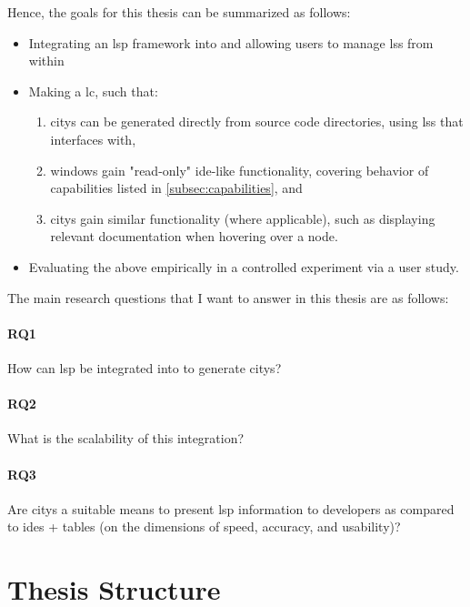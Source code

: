 \documentclass[../thesis]{subfiles}
\begin{document}
Hence, the goals for this thesis can be summarized as follows:
\begin{itemize}
	\item Integrating an \gls{lsp} framework into \SEE{} and allowing users to manage \glspl{ls} from within \SEE{}
	\item Making \SEE{} a \gls{lc}, such that:
	      \begin{enumerate}
		      \item \Glspl{city} can be generated directly from source code directories, using \glspl{ls} that \SEE{} interfaces with,
		      \item \Glspl{window} gain "read-only" \gls{ide}-like functionality, covering behavior of capabilities listed in \cref{subsec:capabilities}, and
		      \item \Glspl{city} gain similar functionality (where applicable), such as displaying relevant documentation when hovering over a node.
	      \end{enumerate}
	\item Evaluating the above empirically in a controlled experiment via a user study.
\end{itemize}

The main research questions that I want to answer in this thesis are as follows:

\vspace{-1.5em}
\paragraph{RQ1}
How can \gls{lsp} be integrated into \SEE{} to generate \glspl{city}?
\vspace{-1.5em}
\paragraph{RQ2}
What is the scalability of this integration?
\vspace{-1.5em}
\paragraph{RQ3}
Are \glspl{city} a suitable means to present \gls{lsp} information to developers as compared to \glspl{ide} + tables (on the dimensions of speed, accuracy, and usability)?

\section{Thesis Structure}
\end{document}
